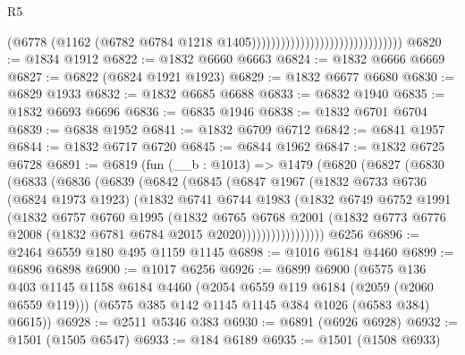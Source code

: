 \begin{lexlean}{R5}
\begin{coremodule}
                                                            (@6778
                                                              (@1162
                                                                (@6782
                                                                  @6784
                                                                  @1218
                                                                  @1405)))))))))))))))))))))))))))))))
@6820 := @1834 @1912
@6822 := @1832 @6660 @6663
@6824 := @1832 @6666 @6669
@6827 := @6822 (@6824 @1921 @1923)
@6829 := @1832 @6677 @6680
@6830 := @6829 @1933
@6832 := @1832 @6685 @6688
@6833 := @6832 @1940
@6835 := @1832 @6693 @6696
@6836 := @6835 @1946
@6838 := @1832 @6701 @6704
@6839 := @6838 @1952
@6841 := @1832 @6709 @6712
@6842 := @6841 @1957
@6844 := @1832 @6717 @6720
@6845 := @6844 @1962
@6847 := @1832 @6725 @6728
@6891 := @6819
    (fun (__b : @1013) =>
    @1479
      (@6820
        (@6827
          (@6830
            (@6833
              (@6836
                (@6839
                  (@6842
                    (@6845
                      (@6847
                        @1967
                        (@1832
                          @6733
                          @6736
                          (@6824 @1973 @1923)
                          (@1832
                            @6741
                            @6744
                            @1983
                            (@1832
                              @6749
                              @6752
                              @1991
                              (@1832
                                @6757
                                @6760
                                @1995
                                (@1832
                                  @6765
                                  @6768
                                  @2001
                                  (@1832
                                    @6773
                                    @6776
                                    @2008
                                    (@1832 @6781 @6784 @2015 @2020)))))))))))))))))
    @6256
@6896 := @2464 @6559 @180 @495 @1159 @1145
@6898 := @1016 @6184 @4460
@6899 := @6896 @6898
@6900 := @1017 @6256
@6926 := @6899
    @6900
    (@6575
      @136
      @403
      @1145
      @1158
      @6184
      @4460
      (@2054 @6559 @119 @6184 (@2059 (@2060 @6559 @119)))
      (@6575 @385 @142 @1145 @1145 @384 @1026 (@6583 @384) @6615))
@6928 := @2511 @5346 @383
@6930 := @6891 (@6926 @6928)
@6932 := @1501 (@1505 @6547)
@6933 := @184 @6189
@6935 := @1501 (@1508 @6933)

\end{coremodule}
\end{lexlean}
